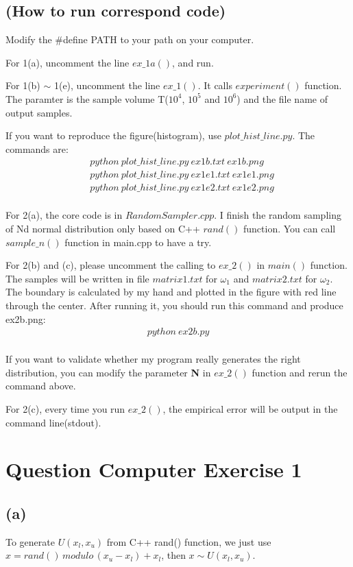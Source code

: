 \documentclass{article}
\newcommand{\question}[1]{\section*{Question #1}}
\renewcommand{\part}[1]{\subsection*{(#1)}}
\begin{document}
\part{How to run correspond code}
Modify the \#define PATH to your path on your computer. \par
For 1(a), uncomment the line $ex\_1a()$, and run. \par
For 1(b) $\sim$ 1(e), uncomment the line $ex\_1()$. It calls $experiment()$ function. The paramter is the sample volume T($10^4$, $10^5$ and $10^6$) and the file name of output samples. \par
If you want to reproduce the figure(histogram), use $plot\_hist\_line.py$. The commands are:
\begin{align*}
  & python \ plot\_hist\_line.py \ ex1b.txt \ ex1b.png \\
  & python \ plot\_hist\_line.py \ ex1e1.txt \ ex1e1.png \\
  & python \ plot\_hist\_line.py \ ex1e2.txt \ ex1e2.png \\
\end{align*} \par
For 2(a), the core code is in $RandomSampler.cpp$. I finish the random sampling of Nd normal distribution only based on C++ $rand()$ function. You can call $sample\_n()$ function in main.cpp to have a try. \par
For 2(b) and (c), please uncomment the calling to $ex\_2()$ in $main()$ function. The samples will be written in file $matrix1.txt$ for $\omega_1$ and $matrix2.txt$ for $\omega_2$. The boundary is calculated by my hand and plotted in the figure with red line through the center. After running it, you should run this command and produce ex2b.png:
\begin{align*}
  python \ ex2b.py \\
\end{align*} \par
If you want to validate whether my program really generates the right distribution, you can modify the parameter \textbf{N} in $ex\_2()$ function and rerun the command above. \par
For 2(c), every time you run $ex\_2()$, the empirical error will be output in the command line(stdout). \par
\question{Computer Exercise 1}
\part{a}
  To generate $U(x_l, x_u)$ from C++ rand() function, we just use $x = rand() \, modulo \, (x_u - x_l) + x_l$, then $x \sim U(x_l, x_u)$.
\end{document}
